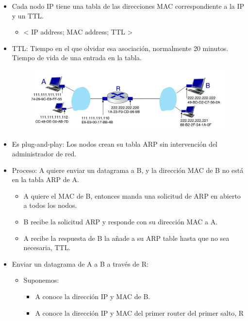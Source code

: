 \documentclass[12pt, twoside, openright]{report} %
\begin{document}
\begin{itemize}
        \begin{itemize}
        \item
          Cada nodo IP tiene una tabla de las direcciones MAC
          correspondiente a la IP y un TTL.
          \begin{itemize}
            \item
            \textless{} IP address; MAC address; TTL \textgreater{}
          \end{itemize}
        \item TTL: Tiempo en el que olvidar esa asociación, normalmente 20 minutos.
  Tiempo de vida de una entrada en la tabla.
  \begin{figure}[H]
    {\includegraphics[scale=.25]{Untitled 57.png}}
  \end{figure}
        \item Es plug-and-play: Los nodos crean su tabla ARP sin intervención del administrador de red.
        \item Proceso: A quiere enviar un datagrama a B, y la dirección MAC de B no está en la tabla ARP de A.
        \begin{itemize}
         \item A quiere el MAC de B, entonces manda una solicitud de ARP en abierto a todos los nodos.
         \item B recibe la solicitud ARP y responde con su dirección MAC a A.
         \item A recibe la respuesta de B la añade a su ARP table hasta que no sea necesaria, TTL.       
        \end{itemize}
        \item Enviar un datagrama de A a B a través de R:
        \begin{itemize}
          \item Suponemos:
          \begin{itemize}
           \item A conoce la dirección IP y MAC de B.
           \item A conoce la dirección IP y MAC del primer router del primer salto, R 
          \end{itemize}
         

\end{itemize}
\end{itemize}
\end{itemize}
\end{document}
